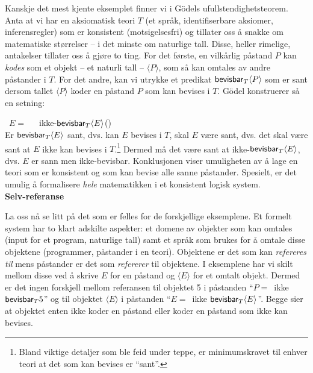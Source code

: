 \documentclass[10pt,twocolumn]{article}
\newcounter{EQ}
\newcommand{\equ}[1]{\refstepcounter{EQ}\vspace{.5ex}\par\noindent\ 
    \hfill #1\hfill{(\theEQ)}\\[.5ex]}
\newcommand{\<}{\langle}
\renewcommand{\>}{\rangle}
\begin{document}
Kanskje det mest kjente eksemplet
finner vi i G\"{o}dels ufullstendighetsteorem. 
Anta at vi har en aksiomatisk teori $T$ (et spr{\aa}k, identifiserbare aksiomer,
 inferensregler) som er konsistent (motsigelsesfri) og tillater oss 
{\aa} snakke om matematiske st{\o}rrelser -- i det minste om 
naturlige tall.
Disse, heller rimelige, antakelser 
tillater oss {\aa} gj{\o}re to ting. For det f{\o}rste, en
 vilk{\aa}rlig p{\aa}stand 
$P$ kan {\em kodes} som et objekt -- et naturli tall -- $\<P\>$, 
som s{\aa} kan omtales av 
andre p{\aa}stander i $T$. For det andre, kan vi utrykke 
et predikat ${\sf bevisbar}_{T}\<P\>$ som er sant 
dersom tallet $\<P\>$ koder en p{\aa}stand $P$ som
kan bevises i $T$. 
G\"{o}del konstruerer s{\aa} en setning:
\equ{$E=$\ \ \ ikke-${\sf bevisbar}_{T}\<E\>$}\label{pa:G}
Er ${\sf bevisbar}_{T}\<E\>$ sant, dvs. kan $E$ bevises i $T$, skal $E$ 
v{\ae}re sant, dvs. det skal 
v{\ae}re sant at $E$ ikke kan bevises i $T$.\footnote{Bland viktige 
detaljer som ble feid under teppe, er minimumskravet til enhver teori at 
det som kan bevises er ``sant''.}
Dermed m{\aa} det v{\ae}re sant at ikke-${\sf bevisbar}_{T}\<E\>$,
dvs. $E$ er sann men ikke-bevisbar. Konklusjonen 
viser umuligheten av {\aa} lage en teori som er 
konsistent og som kan bevise alle sanne p{\aa}stander. Spesielt, er 
det umulig {\aa} formalisere {\em hele} matematikken i et konsistent
logisk system. \\[1.5ex]
%
{\bf Selv-referanse} %

La oss n{\aa} se litt p{\aa} det som er felles for de forskjellige 
eksemplene. Et formelt system har to klart adskilte aspekter: et domene av objekter 
som kan omtales (input for et program, naturlige tall) samt et 
spr{\aa}k som brukes for {\aa} omtale disse objektene (programmer, 
p{\aa}stander i en teori). Objektene er det som kan {\em refereres 
til} mens p{\aa}stander er det som {\em refererer} til objektene. 
I eksemplene har vi skilt mellom disse ved {\aa} skrive $E$ for en p{\aa}stand 
og $\<E\>$ for et omtalt objekt. 
Dermed er det ingen forskjell mellom referansen til objektet 5 i p{\aa}standen
``$P=$\ ikke ${\sf bevisbar}_{T}5$'' og til objektet $\<E\>$ i 
p{\aa}standen ``$E=$\ ikke ${\sf bevisbar}_{T}\<E\>$''. Begge sier at 
objektet enten ikke koder en p{\aa}stand eller koder en p{\aa}stand 
som ikke kan bevises. 
\end{document}
